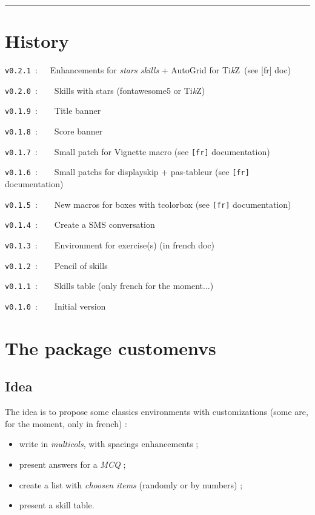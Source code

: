 \documentclass[english,11pt,a4paper]{article}
\providecommand\tikzlogo{Ti\textit{k}Z}
\let\TikZ\tikzlogo
\begin{document}
\hrule

\vfill

\section{History}

\verb|v0.2.1|~:~~~Enhancements for \textit{stars skills} + AutoGrid for \TikZ\ (see \textsf{[fr]} doc)

\verb|v0.2.0|~:~~~~Skills with stars (\textsf{fontawesome5} or \TikZ)

\verb|v0.1.9|~:~~~~Title banner

\verb|v0.1.8|~:~~~~Score banner

\verb|v0.1.7|~:~~~~Small patch for \textsf{Vignette} macro (see \texttt{[fr]} documentation)

\verb|v0.1.6|~:~~~~Small patchs for \textsf{displayskip} + \textsf{pas-tableur} (see \texttt{[fr]} documentation)

\verb|v0.1.5|~:~~~~New macros for boxes with \textsf{tcolorbox} (see \texttt{[fr]} documentation)

\verb|v0.1.4|~:~~~~Create a SMS conversation

\verb|v0.1.3|~:~~~~Environment for exercise(s) (in french doc)

\verb|v0.1.2|~:~~~~Pencil of skills

\verb|v0.1.1|~:~~~~Skills table (only french for the moment...)

\verb|v0.1.0|~:~~~~Initial version

\vspace*{5mm}

\pagebreak

\section{The package customenvs}

\subsection{Idea}

The idea is to propose some classics environments with customizations (some are, for the moment, only in french) :

\begin{itemize}
	\item write in \textit{multicols}, with spacings enhancements ;
	\item present answers for a \textit{MCQ} ;
	\item create a list with \textit{choosen items} (randomly or by numbers) ;
	\item present a skill table.
\end{itemize}
\end{document}
